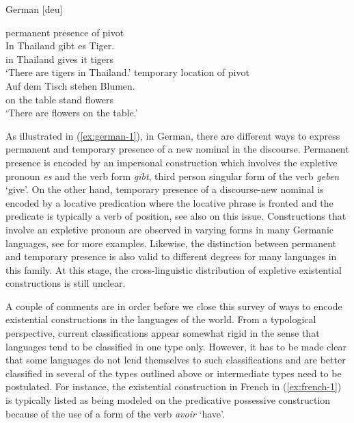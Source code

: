 \documentclass[output=paper,chinesefont,colorlinks,citecolor=brown]{langscibook}
\begin{document}
\begin{exe}
\ex German [deu] \citep{haspelmath2021}\label{ex:german-1}
\begin{xlist}
\ex permanent presence of pivot\label{ex:german-1tigers}\\
\gll In Thailand gibt es Tiger.\\
in Thailand gives it tigers\\
\glt ‘There are tigers in Thailand.'
\ex temporary location of pivot \label{ex:german-1flowers}\\
\gll Auf dem Tisch stehen Blumen.\\
on the table stand flowers\\
\glt ‘There are flowers on the table.'
\end{xlist}
\end{exe}
As illustrated in (\ref{ex:german-1}), in German, there are different ways to express permanent and temporary presence of a new nominal in the discourse. Permanent presence is encoded by an impersonal construction which involves the expletive pronoun \textit{es} and the verb form \textit{gibt}, third person singular form of the verb \textit{geben} ‘give’. On the other hand, temporary presence of a discourse-new nominal is encoded by a locative predication where the locative phrase is fronted and the predicate is typically a verb of position, see also \citet[534--535]{Koch2012} on this issue. Constructions that involve an expletive pronoun are observed in varying forms in many Germanic languages, see \citet[222--223]{McNally2016} for more examples. Likewise, the distinction between permanent and temporary presence is also valid to different degrees for many languages in this family. At this stage, the cross-linguistic distribution of expletive existential constructions is still unclear.

A couple of comments are in order before we close this survey of ways to encode existential constructions in the languages of the world. From a typological perspective, current classifications appear somewhat rigid in the sense that languages tend to be classified in one type only. However, it has to be made clear that some languages do not lend themselves to such classifications and are better classified in several of the types outlined above or intermediate types need to be postulated. For instance, the existential construction in French in (\ref{ex:french-1}) is typically listed as being modeled on the predicative possessive construction because of the use of a form of the verb \textit{avoir} ‘have’.
\end{document}
